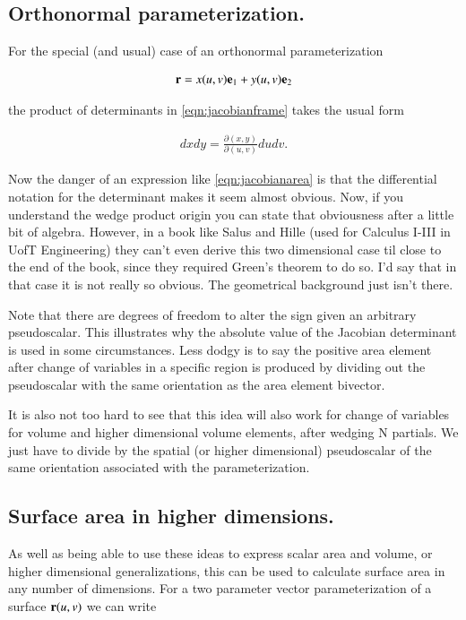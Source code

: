\documentclass{article}
\newcommand{\PD}[2]{\frac{\partial {#2}}{\partial {#1}}}
\begin{document}
\subsection{ Orthonormal parameterization. } 

For the special (and usual) case of an orthonormal parameterization

\begin{align*}
\mathbf{r} = x(u,v) \mathbf{e}_1 + y(u,v) \mathbf{e}_2
\end{align*}

the product of determinants in \ref{eqn:jacobianframe} takes the usual form

\begin{align}\label{eqn:jacobianarea}
dx dy = \PD{(u,v)}{(x,y)} du dv.
\end{align}

Now the danger of an expression like \ref{eqn:jacobianarea} is that the differential notation for the determinant makes it seem almost
obvious.  Now, if you understand the wedge product origin you can state
that obviousness after a little bit of algebra.  However, in a book like Salus and Hille (used for Calculus I-III in UofT Engineering) they
can't even derive this two dimensional case til close to the end of the book, since they required Green's theorem to do so.  I'd say that in that case it is not really so obvious.  The geometrical background just isn't there.

Note that there are degrees of freedom to alter the sign given an arbitrary pseudoscalar.  This illustrates why the absolute value of the Jacobian determinant is used in some circumstances.  Less dodgy is to say the positive area element after change of variables in a specific region is produced by dividing out the pseudoscalar with the same orientation as the area element bivector.

It is also not too hard to see that this idea will also work for change of variables for volume and higher
dimensional volume elements, after wedging N partials.  We just have to divide by the spatial (or higher dimensional) pseudoscalar of the
same orientation associated with the parameterization.

\subsection{ Surface area in higher dimensions. }

As well as being able to use these ideas to express scalar area and volume, or higher dimensional generalizations, this can be used to calculate surface area in any number of dimensions.  For a two parameter vector parameterization of a surface $\mathbf{r}(u,v)$ we can write
\end{document}

